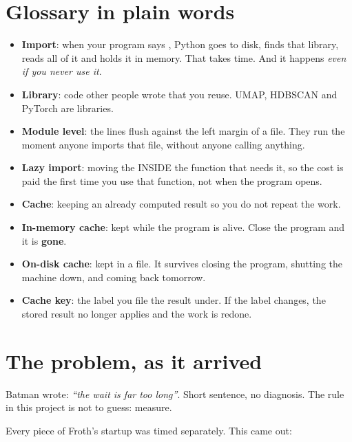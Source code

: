\documentclass[11pt,a4paper]{article}
\begin{document}

\section{Glossary in plain words}

\begin{itemize}
  \item \textbf{Import}: when your program says , Python goes to
        disk, finds that library, reads all of it and holds it in memory. That takes
        time. And it happens \emph{even if you never use it}.
  \item \textbf{Library}: code other people wrote that you reuse. UMAP, HDBSCAN and
        PyTorch are libraries.
  \item \textbf{Module level}: the lines flush against the left margin of a 
        file. They run the moment anyone imports that file, without anyone calling
        anything.
  \item \textbf{Lazy import}: moving the  INSIDE the function that needs
        it, so the cost is paid the first time you use that function, not when the
        program opens.
  \item \textbf{Cache}: keeping an already computed result so you do not repeat the work.
  \item \textbf{In-memory cache}: kept while the program is alive. Close the program and
        it is \textbf{gone}.
  \item \textbf{On-disk cache}: kept in a file. It survives closing the program, shutting
        the machine down, and coming back tomorrow.
  \item \textbf{Cache key}: the label you file the result under. If the label changes,
        the stored result no longer applies and the work is redone.
\end{itemize}

\section{The problem, as it arrived}

Batman wrote: \emph{``the wait is far too long''}. Short sentence, no diagnosis. The rule
in this project is not to guess: measure.

Every piece of Froth's startup was timed separately. This came out:
\end{document}
